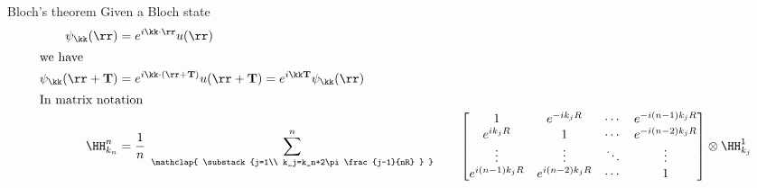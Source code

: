 \begin{frame}
\begin{block}{Bloch's theorem}
    Given a Bloch state
    \begin{align*}
      \psi_\kk(\rr) &= e^{i\kk\cdot\rr} u(\rr)
      \\
      \shortintertext{we have}
      \psi_\kk(\rr+\mathbf T) &= e^{i\kk\cdot(\rr+\mathbf T)} u(\rr+\mathbf T) =
      e^{i\kk\mathbf T}\psi_\kk(\rr)
      \\
      \shortintertext{In matrix notation}
      \HH_{k_n}^n &=\frac1n
      \;
      \sum_{
          \mathclap{
              \substack{j=1\\
                  k_j=k_n+2\pi\frac{j-1}{nR}
              }
          }
      }^n
      \qquad
      \begin{bmatrix}
        1
        &
        e^{-i k_jR}
        &
        \cdots
        &
        e^{-i (n-1)k_jR}
        \\
        e^{i k_jR}
        &
        1
        &
        \cdots
        &
        e^{-i (n-2)k_jR}
        \\
        \vdots
        &
        \vdots
        &
        \ddots
        &
        \vdots
        \\
        e^{i (n-1)k_jR}
        &
        e^{i (n-2)k_jR}
        &
        \cdots
        &1
      \end{bmatrix}
      \otimes
      \HH_{k_j}^1
    \end{align*}

  \end{block}

\end{frame}

